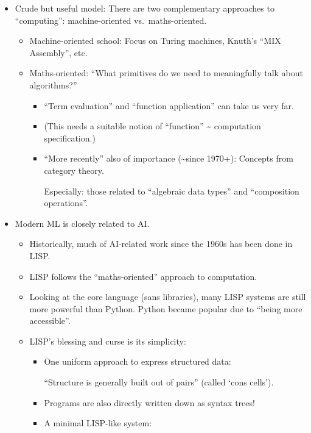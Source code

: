 \documentclass[11pt]{article}
\providecommand{\tightlist}{%
      \setlength{\itemsep}{0pt}\setlength{\parskip}{0pt}}
\begin{document}
    \begin{itemize}
\tightlist
\item
  Crude but useful model: There are two complementary approaches to
  ``computing'': machine-oriented vs.~maths-oriented.

  \begin{itemize}
  \tightlist
  \item
    Machine-oriented school: Focus on Turing machines, Knuth's ``MIX
    Assembly'', etc.
  \item
    Maths-oriented: ``What primitives do we need to meaningfully talk
    about algorithms?''

    \begin{itemize}
    \item
      ``Term evaluation'' and ``function application'' can take us very
      far.
    \item
      (This needs a suitable notion of ``function'' \textasciitilde{}
      computation specification.)
    \item
      ``More recently'' also of importance (\textasciitilde since
      1970+): Concepts from category theory.

      Especially: those related to ``algebraic data types'' and
      ``composition operations''.
    \end{itemize}
  \end{itemize}
\item
  Modern ML is closely related to AI.

  \begin{itemize}
  \tightlist
  \item
    Historically, much of AI-related work since the 1960s has been done
    in LISP.
  \item
    LISP follows the ``maths-oriented'' approach to computation.
  \item
    Looking at the core language (sans libraries), many LISP systems are
    still more powerful than Python. Python became popular due to
    ``being more accessible''.
  \item
    LISP's blessing and curse is its simplicity:

    \begin{itemize}
    \item
      One uniform approach to express structured data:

      ``Structure is generally built out of pairs'' (called `cons
      cells').
    \item
      Programs are also directly written down as syntax trees!
    \item
      A minimal LISP-like system:


\end{itemize}
\end{itemize}
\end{itemize}
\end{document}
